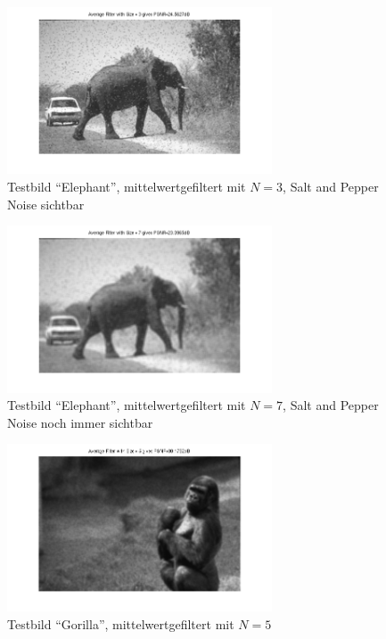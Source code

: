 \begin{figure}[htb]
 \centering
 \includegraphics[width=0.7\textwidth]{../images_out/t2_e_a3.png}
 \caption{Testbild ``Elephant'', mittelwertgefiltert mit $N=3$, Salt and Pepper Noise sichtbar}
 \label{fig:t2_e_a3}
\end{figure}

\begin{figure}[htb]
 \centering
 \includegraphics[width=0.7\textwidth]{../images_out/t2_e_a7_.png}
 \caption{Testbild ``Elephant'', mittelwertgefiltert mit $N=7$, Salt and Pepper Noise noch immer sichtbar}
 \label{fig:t2_e_a7_}
\end{figure}

\begin{figure}[htb]
 \centering
 \includegraphics[width=0.7\textwidth]{../images_out/t2_g_a5.png}
 \caption{Testbild ``Gorilla'', mittelwertgefiltert mit $N=5$}
 \label{fig:t2_g_a5}
\end{figure}

